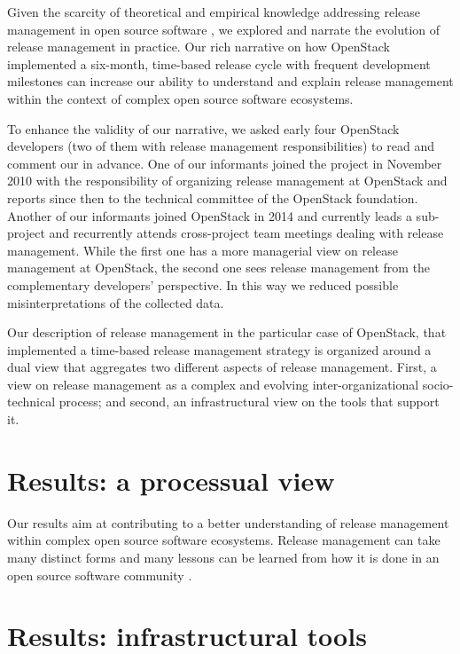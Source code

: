 \documentclass[dvipsnames]{bmcart}
\theoremstyle{definition}
\begin{document}
Given the scarcity of theoretical and empirical knowledge addressing release management in open source software \cite{michlmayr2015and,Poo-Caamano2017}, we explored and narrate  the evolution of release management in practice. Our rich narrative on how OpenStack implemented a six-month, time-based release cycle with frequent development milestones can increase our ability to understand and explain release management within the context of complex open source software ecosystems. 

To enhance the validity of our narrative, we asked early four OpenStack developers (two of them with release management responsibilities) to  read and comment our  in advance. One of our informants joined the project in November 2010 with the responsibility of organizing release management at OpenStack and reports since then to the technical committee of the OpenStack foundation. Another of our informants joined OpenStack in 2014 and currently leads a sub-project and recurrently attends cross-project team meetings dealing with release management. While the first one has a more managerial view on release management at OpenStack, the second one sees release management from the complementary developers' perspective.   
In this way we reduced possible misinterpretations of the collected data. 


Our description of release management in the particular case of OpenStack, that implemented a time-based release management strategy is organized around a dual view that aggregates two different aspects of release management. First, a view on release management as a complex and evolving inter-organizational socio-technical process; and second, an infrastructural view on the tools that support it. 

\section{Results: a processual view}
\label{sc:process}

Our results aim at contributing to a better understanding of release management within complex open source software ecosystems. Release management can take many distinct forms and many lessons can be learned from how it is done in an open source software community \cite{fitzgerald2011open}. 
%




\section{Results: infrastructural tools}
\label{sc:tools}
\end{document}
